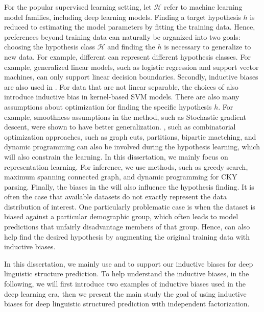For the popular supervised learning setting, let $\mathcal{H}$ refer
to machine learning model families, including deep learning
models. Finding a target hypothesis $h$ is reduced to estimating the
model parameters by fitting the training data. Hence, preferences
beyond training data can naturally be organized into two goals:
choosing the hypothesis class $\mathcal{H}$ and finding the $h$ is
necessary to generalize to new data. For example, different  can represent different hypothesis classes. For example,
generalized linear models, such as logistic regression and support
vector machines, can only support linear decision
boundaries. Secondly, inductive biases are also used in . For data that are not linear separable, the choices of
 also introduce inductive bias in kernel-based
SVM models. There are also many assumptions about optimization for
finding the specific hypothesis $h$. For example, smoothness
assumptions in the  method, such as Stochastic
gradient descent, were shown to have better
generalization. , such as combinatorial
optimization approaches, such as graph cuts, partitions, bipartie
mactching, and dynamic programming can also be involved during the
hypothesis learning, which will also constrain the learning. In this
dissertation, we mainly focus on representation learning. For
inference, we use methods, such as greedy search, maximum spanning
connected graph, and dynamic programming for CKY parsing. Finally, the
biases in the  will also influence the hypothesis
finding. It is often the case that available datasets do not exactly
represent the data distribution of interest. One particularly
problematic case is when the dataset is biased against a particular
demographic group, which often leads to model predictions that
unfairly disadvantage members of that group. Hence,  can also help find the desired hypothesis by
augmenting the original training data with inductive biases.

In this dissertation, we mainly use  and  to support our inductive biases for deep linguistic
structure prediction. To help understand the inductive biases, in
the following, we will first introduce two examples of inductive
biases used in the deep learning era, then we present the main study
the goal of using inductive biases for deep linguistic structured
prediction with independent factorization.

